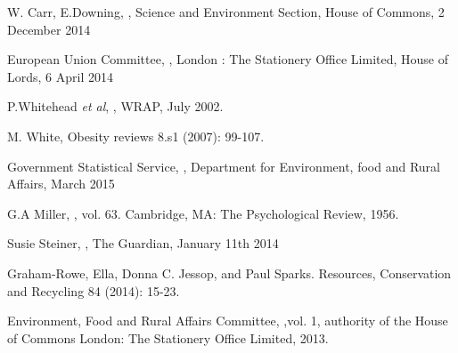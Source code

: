 \documentclass[a4paper, 11pt]{article}
\begin{document}
\clearpage



\begin{thebibliography}{29}

W. Carr, E.Downing, \emph{}, Science and Environment Section, House of Commons, 2 December 2014
\vspace{\baselineskip}

European Union Committee, \emph{}, London : The Stationery Office Limited, House of Lords, 6 April 2014
\vspace{\baselineskip}

P.Whitehead \emph{et al}, \emph{}, WRAP, July 2002.
\vspace{\baselineskip}

M. White, \emph{} Obesity reviews 8.s1 (2007): 99-107.
\vspace{\baselineskip}

Government Statistical Service, \emph{}, Department for Environment, food and Rural Affairs, March 2015
\vspace{\baselineskip}

G.A Miller, \emph{}, vol. 63. Cambridge, MA: The Psychological Review, 1956.
\vspace{\baselineskip}

Susie Steiner, \emph{}, The Guardian, January 11th 2014
\vspace{\baselineskip}

Graham-Rowe, Ella, Donna C. Jessop, and Paul Sparks.\emph{} Resources, Conservation and Recycling 84 (2014): 15-23.
\vspace{\baselineskip}

Environment, Food and Rural Affairs Committee, \emph{},vol. 1, authority of the House of Commons London: The Stationery Office Limited, 2013.
\vspace{\baselineskip}


\end{thebibliography}
\end{document}

